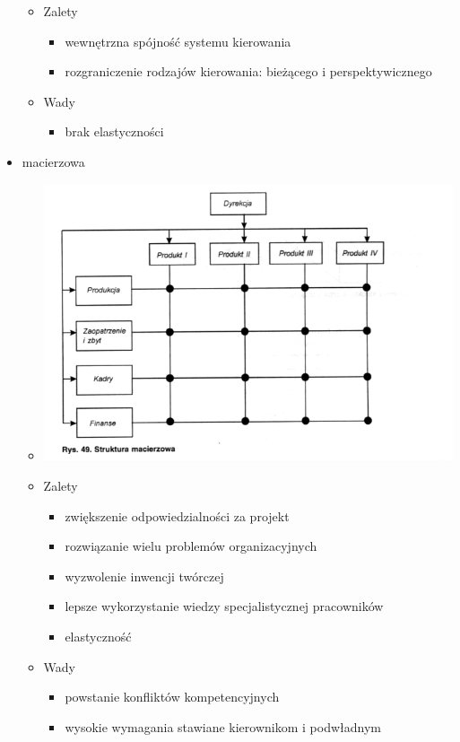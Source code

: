 \documentclass[a4paper,10pt]{report}
\begin{document}
\begin{itemize}
\begin{itemize}
		\item Zalety
		\begin{itemize}
			\item wewnętrzna spójność systemu kierowania
			\item rozgraniczenie rodzajów kierowania: bieżącego i perspektywicznego
		\end{itemize}
		\item Wady
		\begin{itemize}
			\item brak elastyczności
		\end{itemize}
	\end{itemize}	
	\item macierzowa
	\begin{itemize}
		\item \includegraphics[scale=0.4]{assets/str_macierzowa}
		\item Zalety
		\begin{itemize}
			\item zwiększenie odpowiedzialności za projekt
			\item rozwiązanie wielu problemów organizacyjnych
			\item wyzwolenie inwencji twórczej
			\item lepsze wykorzystanie wiedzy specjalistycznej pracowników
			\item elastyczność
		\end{itemize}
		\item Wady
		\begin{itemize}
			\item powstanie konfliktów kompetencyjnych
			\item wysokie wymagania stawiane kierownikom i podwładnym

\end{itemize}
\end{itemize}
\end{itemize}
\end{document}
